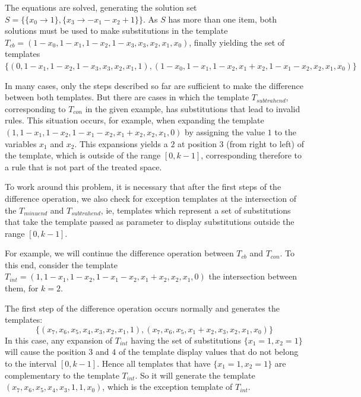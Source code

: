 \documentclass{llncs}
\begin{document}
The equations are solved, generating the solution set $S = \{\{x_0\to 1\},\{x_3\to -x_1-x_2+1\}\}$. As $S$ has more than one item, both solutions must be used to make substitutions in the template $T_{cb} = (1 - x_0, 1 - x_1, 1 - x_2, 1 - x_3, x_3, x_2, x_1, x_0)$, finally yielding the set of templates $\{(0, 1 - x_1, 1 - x_2, 1 - x_3, x_3, x_2, x_1, 1),(1 - x_0, 1 - x_1, 1 - x_2, x_1 + x_2, 1 - x_1 - x_2, x_2, x_1, x_0)\}$


In many cases, only the steps described so far are sufficient to make the difference between both templates. But there are cases in which the template $T_{subtrahend}$, corresponding to $T_{con}$ in the given example, has substitutions that lead to invalid rules. This situation occurs, for example, when expanding the template $(1, 1 - x_1, 1 - x_2, 1 - x_1 - x_2, x_1 + x_2, x_2, x_1, 0)$ by assigning the value $1$ to the variables $x_1$ and $x_2$. This expansions yields a $2$ at position $3$ (from right to left) of the template, which is outside of the range $[0, k-1]$, corresponding therefore to a rule that is not part of the treated space.

To work around this problem, it is necessary that after the first steps of the difference operation, we also check for exception templates at the intersection of the $T_{minuend}$ and $T_{subtrahend}$, ie, templates which represent a set of substitutions that take the template passed as parameter to display  substitutions outside the range $[0,k-1]$. %

For example, we will continue the difference operation between $T_{cb}$ and $T_{con}$. To this end, consider the template $T_{int} = (1, 1 - x_1, 1 - x_2, 1 - x_1 - x_2, x_1 + x_2, x_2, x_1, 0)$ the intersection between them, for $k=2$.

The first step of the difference operation occurs normally and generates the templates: 
\begin{displaymath}
\{(x_7, x_6, x_5, x_4, x_3, x_2, x_1, 1),(x_7, x_6, x_5, x_1 + x_2, x_3, x_2, x_1, x_0)\}
\end{displaymath}
In this case, any expansion of $T_{int}$ having the set of substitutions $\{x_1 = 1, x_2 = 1\}$ will cause the position $3$ and $4$ of the template display values that do not belong to the interval $[0,k-1]$.
Hence all templates that have $\{x_1 = 1, x_2 = 1\}$ are complementary to the template $T_{int}$. So it will generate the template $(x_7, x_6, x_5, x_4, x_3, 1, 1, x_0)$, which is the exception template of $T_{int}$.
\end{document}
